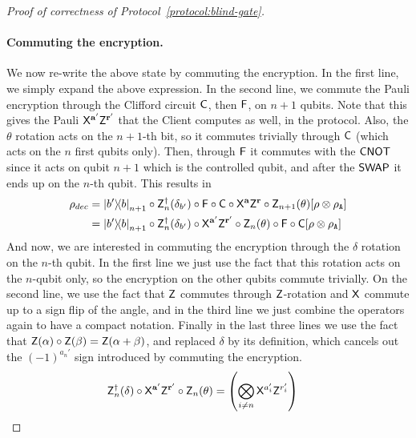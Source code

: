 \begin{proof}[Proof of correctness of Protocol~\ref{protocol:blind-gate}]
        \paragraph{Commuting the encryption.}
        We now re-write the above state by commuting the encryption.
        In the first line, we simply expand the above expression. In the second line, we commute the Pauli encryption through the Clifford circuit $\mathsf{C}$, then $\mathsf{F}$, on $n+1$ qubits. Note that this gives the Pauli $\mathsf{X}^{\mathbf a'}\mathsf{Z}^{\mathbf r'}$ that the Client computes as well, in the protocol. Also, the $\theta$ rotation acts on the $n+1$-th bit, so it commutes trivially through $\mathsf{C}$ (which acts on the $n$ first qubits only). Then, through $\mathsf{F}$ it commutes with the $\mathsf{CNOT}$ since it acts on qubit $n+1$ which is the controlled qubit, and after the $\mathsf{SWAP}$ it ends up on the $n$-th qubit.
        This results in
        \begin{align}
            \rho_{dec}
            &=
            \ketbra{b'}{b}_{n+1}
            \circ
            \mathsf{Z}_n^\dagger(\delta_{b'})
            \circ
            \mathsf{F}
            \circ
            \mathsf{C}
            \circ
            \mathsf{X}^{\mathbf a}
            \mathsf{Z}^{\mathbf r}
            \circ
            \mathsf{Z}_{n+1}(\theta)
        [
            \rho\otimes \rho_{\mathtt{A}}
        ]
        \\
            &=
            \ketbra{b'}{b}_{n+1}
            \circ
            \mathsf{Z}_n^\dagger(\delta_{b'})
            \circ
            \mathsf{X}^{\mathbf a'}
            \mathsf{Z}^{\mathbf r'}
            \circ
            \mathsf{Z}_{n}(\theta)
            \circ
            \mathsf{F}
            \circ
            \mathsf{C}
        [
            \rho\otimes \rho_{\mathtt{A}}
        ]
        \end{align}
        And now, we are interested in commuting the encryption through the $\delta$ rotation on the $n$-th qubit. In the first line we just use the fact that this rotation acts on the $n$-qubit only, so the encryption on the other qubits commute trivially. On the second line, we use the fact that $\mathsf{Z}$ commutes through $\mathsf{Z}$-rotation and $\mathsf{X}$ commute up to a sign flip of the angle, and in the third line we just combine the operators again to have a compact notation. Finally in the last three lines we use the fact that $\mathsf{Z}(\alpha)\circ \mathsf{Z}(\beta) = \mathsf{Z}(\alpha+\beta)$, and replaced $\delta$ by its definition, which cancels out the $(-1)^{a_n'}$ sign introduced by commuting the encryption.
        \begin{align}
            \Z_n^{\dagger}(\delta) \circ \X^{\a'}\Z^{\r'} \circ \Z_{n}(\theta)
            &=
            \left(\bigotimes_{i\neq n}\X^{a'_i}\Z^{r'_i}\right)

\end{align}
\end{proof}
